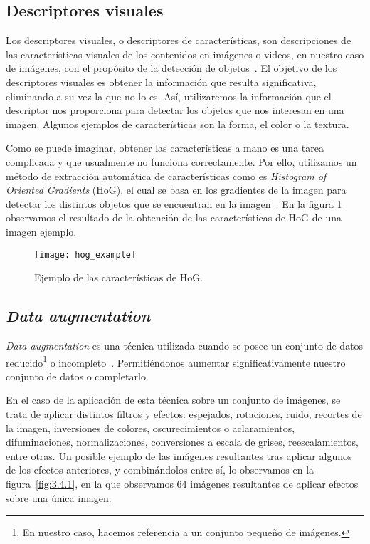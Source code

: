 \subsection{Descriptores visuales}

Los descriptores visuales, o descriptores de características, son descripciones de las características visuales de los contenidos en imágenes o videos, en nuestro caso de imágenes, con el propósito de la detección de objetos~\cite{wiki:visualdescriptor}. El objetivo de los descriptores visuales es obtener la información que resulta significativa, eliminando a su vez la que no lo es. Así, utilizaremos la información que el descriptor nos proporciona para detectar los objetos que nos interesan en una imagen. Algunos ejemplos de características son la forma, el color o la textura.

Como se puede imaginar, obtener las características a mano es una tarea complicada y que usualmente no funciona correctamente. Por ello, utilizamos un método de extracción automática de características como es \textit{Histogram of Oriented Gradients} (HoG), el cual se basa en los gradientes de la imagen para detectar los distintos objetos que se encuentran en la imagen~\cite{wiki:hog}. En la figura \ref{fig:3.4.2} observamos el resultado de la obtención de las características de HoG de una imagen ejemplo.

\begin{figure}
\centering
\texttt{[image: hog\_example]}
\caption{Ejemplo de las características de HoG.}
\label{fig:3.4.2}
\end{figure}

\subsection{\textit{Data augmentation}}

\textit{Data augmentation} es una técnica utilizada cuando se posee un conjunto de datos reducido\footnote{En nuestro caso, hacemos referencia a un conjunto pequeño de imágenes.} o incompleto~\cite{emalgorithm}. Permitiéndonos aumentar significativamente nuestro conjunto de datos o completarlo. 

En el caso de la aplicación de esta técnica sobre un conjunto de imágenes, se trata de aplicar distintos filtros y efectos: espejados, rotaciones, ruido, recortes de la imagen, inversiones de colores, oscurecimientos o aclaramientos, difuminaciones, normalizaciones, conversiones a escala de grises, reescalamientos, entre otras. Un posible ejemplo de las imágenes resultantes tras aplicar algunos de los efectos anteriores, y combinándolos entre sí, lo observamos en la figura~\ref{fig:3.4.1}, en la que observamos 64 imágenes resultantes de aplicar efectos sobre una única imagen.

